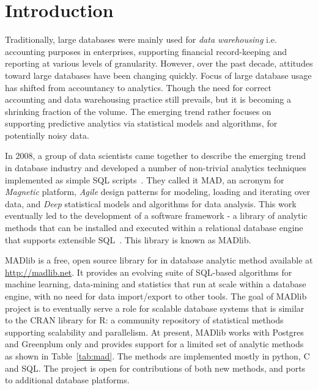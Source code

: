 \section{Introduction}
\label{sect:introduction}
Traditionally, large databases were mainly used for {\itshape data warehousing} i.e. accounting purposes in enterprises, supporting financial record-keeping and reporting at various levels of granularity. However, over the past decade, attitudes toward large databases have been changing quickly. Focus of large database usage has shifted from accountancy to analytics. Though the need for correct accounting and data warehousing practice still prevails, but it is becoming a shrinking fraction of the volume. The emerging trend rather focuses on supporting predictive analytics via statistical models and algorithms, for potentially noisy data.

In 2008, a group of data scientists came together to describe the emerging trend in database industry and developed a number of non-trivial analytics techniques implemented as simple SQL scripts~\cite{mad09}. They called it MAD, an acronym for \emph{Magnetic} platform, \emph{Agile} design patterns for modeling, loading and iterating over data, and \emph{Deep} statistical models and algorithms for data analysis. This work eventually led to the development of a software framework - a library of analytic methods that can be installed and executed within a relational database engine that supports extensible SQL~\cite{madlib12}. This library is known as MADlib.

MADlib is a free, open source library for in database analytic method available at \url{http://madlib.net}. It provides an evolving suite of SQL-based algorithms for machine learning, data-mining and statistics that run at scale within a database engine, with no need for data import/export to other tools. The goal of MADlib project is to eventually serve a role for scalable database systems that is similar to the CRAN library for R: a community repository of statistical methods supporting scalability and parallelism. At present, MADlib works with Postgres and Greenplum only and provides support for a limited set of analytic methods as shown in Table~\ref{tab:mad}. The methods are implemented mostly in python, C and SQL. The project is open for contributions of both new methods, and ports to additional database platforms.

